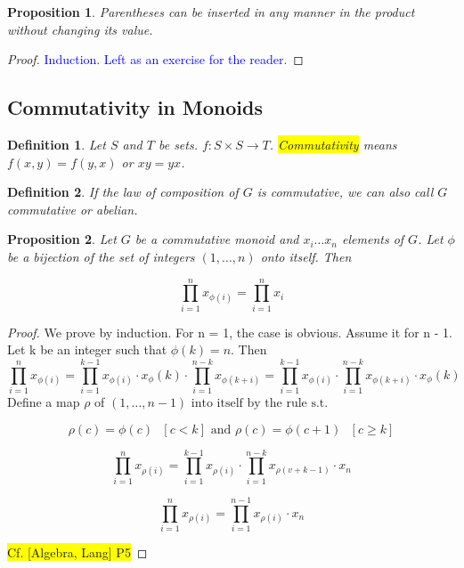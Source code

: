 \documentclass[12pt]{article}
\newcommand{\mybox}[2][black]{\colorbox{#1}{#2}}
\newtheorem{definition}{Definition}
\newtheorem{proposition}{Proposition}
\begin{document}
\begin{proposition}
Parentheses can be inserted in any manner in the product without changing its value. 
\end{proposition}

\begin{proof}
\textcolor{blue}{Induction. Left as an exercise for the reader.}
\end{proof}



\subsection{Commutativity in Monoids}
\begin{definition}
Let $S$ and $T$ be sets. $f: S \times S \rightarrow T$. \mybox[yellow]{Commutativity} means $f(x,y) = f(y,x)$ or $xy = yx$.
\end{definition}

\begin{definition}
If the law of composition of $G$ is commutative, we can also call $G$ commutative or abelian.
\end{definition}



\begin{proposition}
Let $G$ be a commutative monoid and $x_i \ldots x_n$ elements of $G$. Let $\phi$ be a bijection of the set of integers $(1, \ldots ,n)$ onto itself. Then 

\[\prod_{i = 1}^{n} x_{\phi(i)} = \prod_{i = 1}^{n}x_i\]
\end{proposition}
\begin{proof}
We prove by induction. For n = 1, the case is obvious. Assume it for n - 1. Let k be an integer such that $\phi(k)=n$. Then
\[  \prod_{i = 1}^{n} x_{\phi(i)} = \prod_{i = 1}^{k-1} x_{\phi(i)} \cdot x_\phi(k) \cdot \prod_{i = 1}^{n-k} x_{\phi(k+i)} = \prod_{i = 1}^{k-1} x_{\phi(i)} \cdot \prod_{i = 1}^{n-k} x_{\phi(k+i)} \cdot x_\phi(k) \]
Define a map $\rho$ of $(1, \ldots, n-1) \text{ into itself by the rule s.t.}$

\[ \rho(c) = \phi(c) \text{  }  [c < k]  \text{ and } \rho(c) = \phi(c+1) \text{  } [c \geq k]\]

\[\prod_{i = 1}^{n} x_{\rho(i)} = \prod_{i = 1}^{k-1} x_{\rho(i)} \cdot \prod_{i = 1}^{n-k} x_{\rho(v+k-1)} \cdot  x_{n} \]

\[\prod_{i = 1}^{n} x_{\rho(i)} = \prod_{i = 1}^{n-1} x_{\rho(i)} \cdot  x_{n} \]


\mybox[yellow]{Cf. [Algebra, Lang] P5}

\end{proof}
\end{document}
